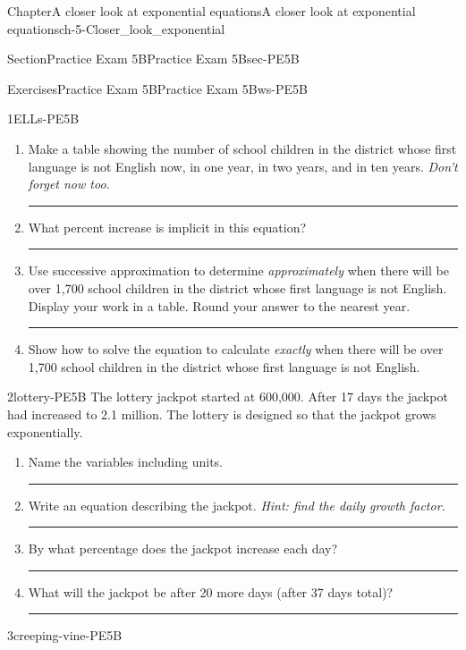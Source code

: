 \documentclass[twoside,11pt,]{book}
\newlength{\workspacestrutwidth}
\numberwithin{equation}{section}
\begin{document}
\begin{chapterptx}{Chapter}{A closer look at exponential equations}{}{A closer look at exponential equations}{}{}{ch-5-Closer_look_exponential}
\begin{sectionptx}{Section}{Practice Exam 5B}{}{Practice Exam 5B}{}{}{sec-PE5B}
\begin{exercises-subsection-numberless}{Exercises}{Practice Exam 5B}{}{Practice Exam 5B}{}{}{ws-PE5B}
\begin{divisionexercise}{1}{}{}{ELLs-PE5B}
\begin{enumerate}[label=(\alph*),ref=\alph*]%
\item{}Make a table showing the number of school children in the district whose first language is not English now, in one year, in two years, and in ten years. \emph{Don't forget now too.}%
\par\rule{\workspacestrutwidth}{1in}%
\item{}What percent increase is implicit in this equation?%
\par\rule{\workspacestrutwidth}{0.5in}%
\item{}Use successive approximation to determine \emph{approximately} when there will be over 1,700 school children in the district whose first language is not English. Display your work in a table. Round your answer to the nearest year.%
\par\rule{\workspacestrutwidth}{1in}%
\item{}Show how to solve the equation to calculate \emph{exactly} when there will be over 1,700 school children in the district whose first language is not English.%
\end{enumerate}%
\end{divisionexercise}%
\clearpage
\begin{divisionexercise}{2}{}{}{lottery-PE5B}%
The lottery jackpot started at \textdollar{}600,000. After 17 days the jackpot had increased to \textdollar{}2.1 million. The lottery is designed so that the jackpot grows exponentially.%
\begin{enumerate}[label=(\alph*),ref=\alph*]%
\item{}Name the variables including units.%
\par\rule{\workspacestrutwidth}{1.5in}%
\item{}Write an equation describing the jackpot. \emph{Hint: find the daily growth factor.}%
\par\rule{\workspacestrutwidth}{2.5in}%
\item{}By what percentage does the jackpot increase each day?%
\par\rule{\workspacestrutwidth}{1.5in}%
\item{}What will the jackpot be after 20 more days (after 37 days total)?%
\par\rule{\workspacestrutwidth}{0in}%
\end{enumerate}%
\end{divisionexercise}%
\clearpage
\begin{divisionexercise}{3}{}{}{creeping-vine-PE5B}%

\end{divisionexercise}
\end{exercises-subsection-numberless}
\end{sectionptx}
\end{chapterptx}
\end{document}
